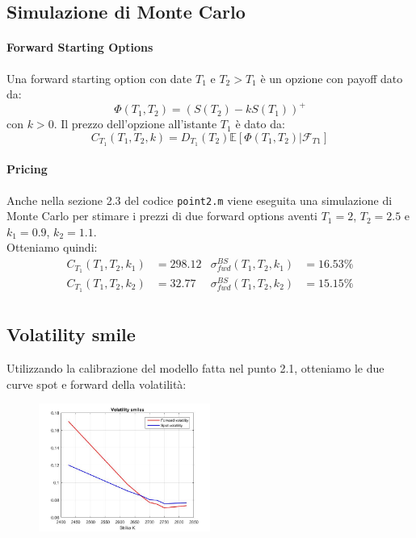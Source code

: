 \documentclass[11pt]{article}
\begin{document}
\subsection{Simulazione di Monte Carlo}
\paragraph{Forward Starting Options}
Una forward starting option con date $T_1$ e $T_2 > T_1$ è un opzione con payoff dato da:
\begin{equation}
\Phi(T_1,T_2) = (S(T_2)-kS(T_1))^+
\end{equation}
con $k>0$. Il prezzo dell'opzione all'istante $T_1$ è dato da:
\begin{equation}
C_{T_1}(T_1,T_2,k)= D_{T_1}(T_2)\mathbb{E}[\Phi(T_1,T_2)|\mathcal{F}_{T1}]
\end{equation}

\paragraph{Pricing}
Anche nella sezione 2.3 del codice \texttt{point2.m} viene eseguita una simulazione di Monte Carlo per stimare i prezzi di due forward options aventi $T_1 = 2$, $T_2 = 2.5$ e $k_1=0.9$, $k_2=1.1$.\\
Otteniamo quindi:
\begin{align*}
C_{T_1}(T_1,T_2,k_1) &= 298.12 & \sigma^{BS}_{fwd}(T_1,T_2,k_1) &= 16.53\%\\
C_{T_1}(T_1,T_2,k_2) &= 32.77 & \sigma^{BS}_{fwd}(T_1,T_2,k_2) &= 15.15\%\\
\end{align*}

\subsection{Volatility smile}
Utilizzando la calibrazione del modello fatta nel punto 2.1, otteniamo le due curve spot e forward della volatilità:

\begin{figure}[H]
\centering
\includegraphics[width=0.5\textwidth]{vol_smile}
\end{figure}
\end{document}
